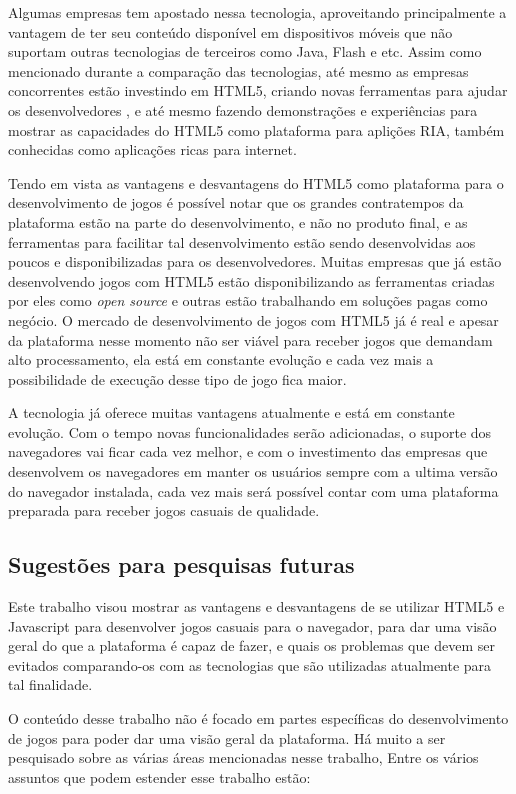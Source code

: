 Algumas empresas tem apostado nessa tecnologia, aproveitando
principalmente a vantagem de ter seu conteúdo disponível em
dispositivos móveis que não suportam outras tecnologias de terceiros
como Java, Flash e etc. Assim como mencionado durante a comparação das
tecnologias, até mesmo as empresas concorrentes estão investindo em
HTML5, criando novas ferramentas para ajudar
os desenvolvedores \cite{website:adobeedge}, e até mesmo fazendo
demonstrações e experiências para mostrar as capacidades do HTML5 como
plataforma para aplições RIA, também conhecidas como aplicações ricas
para internet.

Tendo em vista as vantagens e desvantagens do HTML5 como plataforma
para o desenvolvimento de jogos é possível notar que os grandes
contratempos da plataforma estão na parte do desenvolvimento, e não no
produto final, e as ferramentas para facilitar tal desenvolvimento
estão sendo desenvolvidas aos poucos e disponibilizadas para os
desenvolvedores. Muitas empresas que já estão desenvolvendo jogos com HTML5
estão disponibilizando as ferramentas criadas por eles como
\textit{open source} e outras estão trabalhando em soluções pagas como negócio.
O mercado de desenvolvimento de jogos com HTML5 já é real e apesar
da plataforma nesse momento não ser viável para receber jogos que demandam alto
processamento, ela está em constante evolução e cada
vez mais a possibilidade de execução desse tipo de jogo fica maior.

A tecnologia já oferece muitas vantagens atualmente e está em
constante evolução. Com o tempo novas funcionalidades serão
adicionadas, o suporte dos navegadores vai ficar cada vez melhor, e
com o investimento das empresas que desenvolvem os navegadores em manter
os usuários sempre com a ultima versão do navegador instalada, cada vez
mais será possível contar com uma plataforma preparada para receber
jogos casuais de qualidade.

\subsection{Sugestões para pesquisas futuras}

Este trabalho visou mostrar as vantagens e desvantagens de se utilizar
HTML5 e Javascript para desenvolver jogos casuais para o navegador,
para dar uma visão geral do que a plataforma é capaz de fazer, e quais
os problemas que devem ser evitados comparando-os com as tecnologias
que são utilizadas atualmente para tal finalidade.

O conteúdo desse trabalho não é focado em partes específicas do
desenvolvimento de jogos para poder dar uma visão geral da plataforma.
Há muito a ser pesquisado sobre as várias áreas mencionadas nesse
trabalho, Entre os vários assuntos que podem estender esse trabalho
estão:


